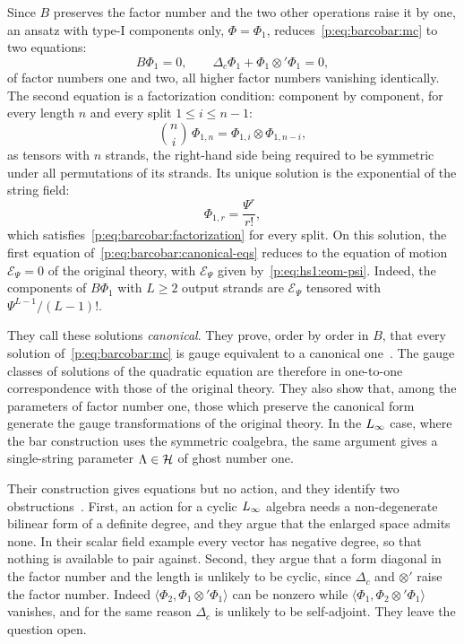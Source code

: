 Since $B$ preserves the factor number and the two other operations raise it by one, an ansatz with type-I components only, $\Phi = \Phi_1$, reduces~\eqref{p:eq:barcobar:mc} to two equations:
\begin{equation}
  \label{p:eq:barcobar:canonical-eqs}
  B \Phi_1
    = 0,
  \qquad
  \Delta_c \Phi_1 + \Phi_1 \otimes' \Phi_1
    = 0,
\end{equation}
of factor numbers one and two, all higher factor numbers vanishing identically.
The second equation is a factorization condition: component by component, for every length $n$ and every split $1 \le i \le n - 1$:
\begin{equation}
  \label{p:eq:barcobar:factorization}
  \binom{n}{i} \, \Phi_{1, n}
    = \Phi_{1, i} \otimes \Phi_{1, n - i},
\end{equation}
as tensors with $n$ strands, the right-hand side being required to be symmetric under all permutations of its strands.
Its unique solution is the exponential of the string field:
\begin{equation}
  \label{p:eq:barcobar:canonical}
  \Phi_{1, r}
    = \frac{\Psi^r}{r!},
\end{equation}
which satisfies~\eqref{p:eq:barcobar:factorization} for every split.
On this solution, the first equation of~\eqref{p:eq:barcobar:canonical-eqs} reduces to the equation of motion $\mathcal E_\Psi = 0$ of the original theory, with $\mathcal E_\Psi$ given by~\eqref{p:eq:hs1:eom-psi}.
Indeed, the components of $B \Phi_1$ with $L \ge 2$ output strands are $\mathcal E_\Psi$ tensored with $\Psi^{L-1} / (L-1)!$.

They call these solutions \emph{canonical}.
They prove, order by order in $B$, that every solution of~\eqref{p:eq:barcobar:mc} is gauge equivalent to a canonical one~\cite{Chiaffrino:2026:UniversalQuadraticField}.
The gauge classes of solutions of the quadratic equation are therefore in one-to-one correspondence with those of the original theory.
They also show that, among the parameters of factor number one, those which preserve the canonical form generate the gauge transformations of the original theory.
In the $L_\infty$ case, where the bar construction uses the symmetric coalgebra, the same argument gives a single-string parameter $\Lambda \in \mathcal{H}$ of ghost number one.

Their construction gives equations but no action, and they identify two obstructions~\cite{Chiaffrino:2026:UniversalQuadraticField}.
First, an action for a cyclic $L_\infty$ algebra needs a non-degenerate bilinear form of a definite degree, and they argue that the enlarged space admits none.
In their scalar field example every vector has negative degree, so that nothing is available to pair against.
Second, they argue that a form diagonal in the factor number and the length is unlikely to be cyclic, since $\Delta_c$ and $\otimes'$ raise the factor number.
Indeed $\langle \Phi_2, \Phi_1 \otimes' \Phi_1 \rangle$ can be nonzero while $\langle \Phi_1, \Phi_2 \otimes' \Phi_1 \rangle$ vanishes, and for the same reason $\Delta_c$ is unlikely to be self-adjoint.
They leave the question open.

